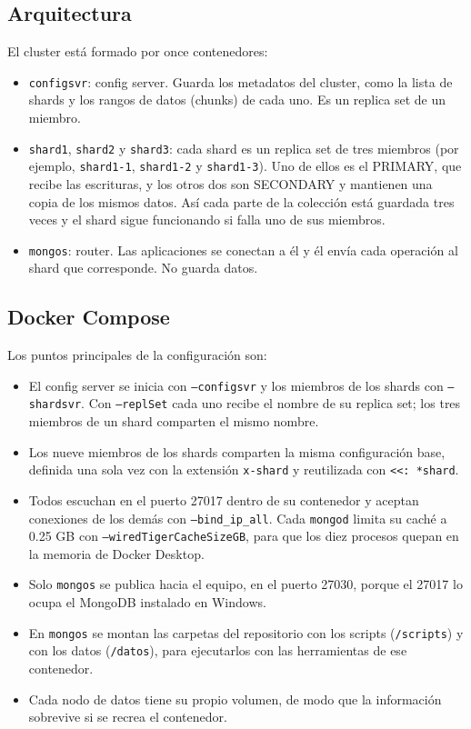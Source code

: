 \documentclass[12pt]{article}
\begin{document}
\subsection{Arquitectura}

El cluster está formado por once contenedores:

\begin{itemize}[itemsep=2pt, topsep=4pt]
    \item \texttt{configsvr}: config server. Guarda los metadatos del cluster, como la lista de shards y los rangos de datos (chunks) de cada uno. Es un replica set de un miembro.
    \item \texttt{shard1}, \texttt{shard2} y \texttt{shard3}: cada shard es un replica set de tres miembros (por ejemplo, \texttt{shard1-1}, \texttt{shard1-2} y \texttt{shard1-3}). Uno de ellos es el PRIMARY, que recibe las escrituras, y los otros dos son SECONDARY y mantienen una copia de los mismos datos. Así cada parte de la colección está guardada tres veces y el shard sigue funcionando si falla uno de sus miembros.
    \item \texttt{mongos}: router. Las aplicaciones se conectan a él y él envía cada operación al shard que corresponde. No guarda datos.
\end{itemize}

\subsection{Docker Compose}



Los puntos principales de la configuración son:

\begin{itemize}[itemsep=2pt, topsep=4pt]
    \item El config server se inicia con \texttt{--configsvr} y los miembros de los shards con \texttt{--shardsvr}. Con \texttt{--replSet} cada uno recibe el nombre de su replica set; los tres miembros de un shard comparten el mismo nombre.
    \item Los nueve miembros de los shards comparten la misma configuración base, definida una sola vez con la extensión \texttt{x-shard} y reutilizada con \texttt{\textless\textless: *shard}.
    \item Todos escuchan en el puerto 27017 dentro de su contenedor y aceptan conexiones de los demás con \texttt{--bind\_ip\_all}. Cada \texttt{mongod} limita su caché a 0.25 GB con \texttt{--wiredTigerCacheSizeGB}, para que los diez procesos quepan en la memoria de Docker Desktop.
    \item Solo \texttt{mongos} se publica hacia el equipo, en el puerto 27030, porque el 27017 lo ocupa el MongoDB instalado en Windows.
    \item En \texttt{mongos} se montan las carpetas del repositorio con los scripts (\texttt{/scripts}) y con los datos (\texttt{/datos}), para ejecutarlos con las herramientas de ese contenedor.
    \item Cada nodo de datos tiene su propio volumen, de modo que la información sobrevive si se recrea el contenedor.
\end{itemize}
\end{document}

